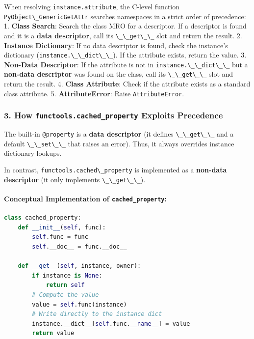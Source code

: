 When resolving \passthrough{\lstinline!instance.attribute!}, the C-level
function \passthrough{\lstinline!PyObject\_GenericGetAttr!} searches
namespaces in a strict order of precedence: 1. \textbf{Class Search}:
Search the class MRO for a descriptor. If a descriptor is found and it
is a \textbf{data descriptor}, call its
\passthrough{\lstinline!\_\_get\_\_!} slot and return the result. 2.
\textbf{Instance Dictionary}: If no data descriptor is found, check the
instance's dictionary (\passthrough{\lstinline!instance.\_\_dict\_\_!}).
If the attribute exists, return the value. 3. \textbf{Non-Data
Descriptor}: If the attribute is not in
\passthrough{\lstinline!instance.\_\_dict\_\_!} but a \textbf{non-data
descriptor} was found on the class, call its
\passthrough{\lstinline!\_\_get\_\_!} slot and return the result. 4.
\textbf{Class Attribute}: Check if the attribute exists as a standard
class attribute. 5. \textbf{AttributeError}: Raise
\passthrough{\lstinline!AttributeError!}.

\hypertarget{how-functools.cached_property-exploits-precedence}{%
\subsubsection{\texorpdfstring{3. How
\texttt{functools.cached\_property} Exploits
Precedence}{3. How functools.cached\_property Exploits Precedence}}\label{how-functools.cached_property-exploits-precedence}}

The built-in \passthrough{\lstinline!@property!} is a \textbf{data
descriptor} (it defines \passthrough{\lstinline!\_\_get\_\_!} and a
default \passthrough{\lstinline!\_\_set\_\_!} that raises an error).
Thus, it always overrides instance dictionary lookups.

In contrast, \passthrough{\lstinline!functools.cached\_property!} is
implemented as a \textbf{non-data descriptor} (it only implements
\passthrough{\lstinline!\_\_get\_\_!}).

\hypertarget{conceptual-implementation-of-cached_property}{%
\paragraph{\texorpdfstring{Conceptual Implementation of
\texttt{cached\_property}:}{Conceptual Implementation of cached\_property:}}\label{conceptual-implementation-of-cached_property}}

\begin{lstlisting}[language=Python]
class cached_property:
    def __init__(self, func):
        self.func = func
        self.__doc__ = func.__doc__

    def __get__(self, instance, owner):
        if instance is None:
            return self
        # Compute the value
        value = self.func(instance)
        # Write directly to the instance dict
        instance.__dict__[self.func.__name__] = value
        return value
\end{lstlisting}

